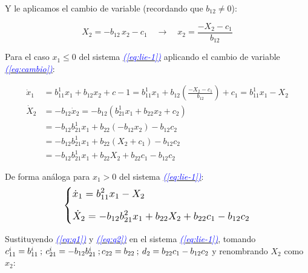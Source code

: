 \documentclass[12pt,a4paper]{report} %
\newcommand{\eref}[1]{\hyperref[#1]{\textcolor{blue}{\textit{(\ref*{#1})}}}}
\begin{document}
	Y le aplicamos el cambio de variable (recordando que $b_{12}\neq0$): 
	
	\begin{equation}
		\label{eq:cambio}
		X_2=-b_{12}\,x_2-c_1\quad \rightarrow \quad x_2=\frac{-X_2-c_1}{b_{12}}
	\end{equation}\smallskip

	Para el caso $x_1\leq 0$ del sistema \eref{eq:lie-1} aplicando el cambio de variable \eref{eq:cambio}:
	
	\begin{equation}
		\label{eq:q1}
	\begin{aligned}
		\dot{x}_1&=b_{11}^1x_1+b_{12}x_2+c-1=b_{11}^1x_1+b_{12}\left(\frac{-X_2-c_1}{b_{12}}\right)+c_1=b_{11}^1x_1-X_2 \\[2mm]
		\dot{X}_2&=-b_{12}\dot{x}_2=-b_{12}\left(b_{21}^1x_1+b_{22}x_2+c_2\right) \\[2mm]
		&=-b_{12}b_{21}^1x_1+b_{22}\left(-b_{12}x_2\right)-b_{12}c_2  \\[2mm]
		&=-b_{12}b_{21}^1x_1+b_{22}\left(X_2+c_1\right)-b_{12}c_2 \\[2mm]
		&=-b_{12}b_{21}^1x_1+b_{22}X_2+b_{22}c_1-b_{12}c_2
	\end{aligned}
	\end{equation}\smallskip
	
	
	De forma análoga para $x_1>0$ del sistema \eref{eq:lie-1}:
	\begin{equation}
		\label{eq:q2}
		\scalebox{1.2}{$\displaystyle
			\left\{
			\begin{aligned}
			&\dot{x}_1=b_{11}^2x_1-X_2 \\[2mm]
			&\dot{X}_2=-b_{12}b_{21}^2x_1+b_{22}X_2+b_{22}c_1-b_{12}c_2
		\end{aligned}
		\right.
		$}
	\end{equation}\smallskip
	
	Sustituyendo \eref{eq:q1} y \eref{eq:q2} en el sistema \eref{eq:lie-1}, tomando $c_{11}^i=b_{11}^i \: ; \: c_{21}^i=-b_{12}b_{21}^i \: ; \: \\ c_{22}=b_{22} \: ; \: d_2=b_{22}c_1-b_{12}c_2$ y renombrando $X_2$ como $x_2$:
	
\end{document}
